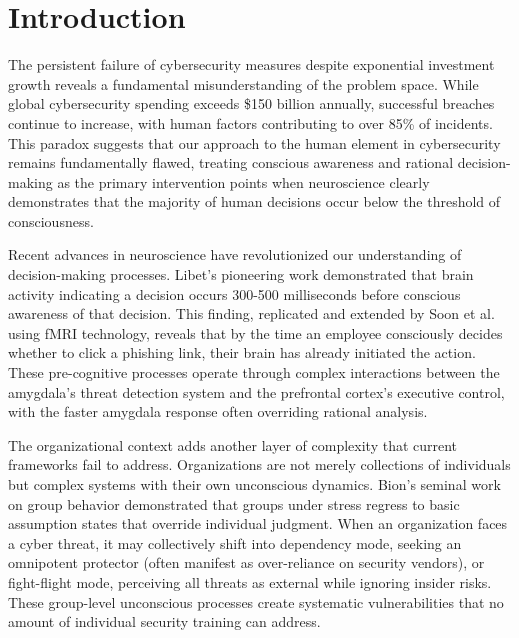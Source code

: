 \documentclass[manuscript,screen,review]{acmart}
\begin{document}

\maketitle

\section{Introduction}

The persistent failure of cybersecurity measures despite exponential investment growth reveals a fundamental misunderstanding of the problem space. While global cybersecurity spending exceeds \$150 billion annually\cite{gartner2023}, successful breaches continue to increase, with human factors contributing to over 85\% of incidents\cite{verizon2023}. This paradox suggests that our approach to the human element in cybersecurity remains fundamentally flawed, treating conscious awareness and rational decision-making as the primary intervention points when neuroscience clearly demonstrates that the majority of human decisions occur below the threshold of consciousness.

Recent advances in neuroscience have revolutionized our understanding of decision-making processes. Libet's pioneering work\cite{libet1983} demonstrated that brain activity indicating a decision occurs 300-500 milliseconds before conscious awareness of that decision. This finding, replicated and extended by Soon et al.\cite{soon2008} using fMRI technology, reveals that by the time an employee consciously decides whether to click a phishing link, their brain has already initiated the action. These pre-cognitive processes operate through complex interactions between the amygdala's threat detection system and the prefrontal cortex's executive control, with the faster amygdala response often overriding rational analysis\cite{ledoux2000}.

The organizational context adds another layer of complexity that current frameworks fail to address. Organizations are not merely collections of individuals but complex systems with their own unconscious dynamics. Bion's seminal work on group behavior\cite{bion1961} demonstrated that groups under stress regress to basic assumption states that override individual judgment. When an organization faces a cyber threat, it may collectively shift into dependency mode, seeking an omnipotent protector (often manifest as over-reliance on security vendors), or fight-flight mode, perceiving all threats as external while ignoring insider risks. These group-level unconscious processes create systematic vulnerabilities that no amount of individual security training can address.
\end{document}
